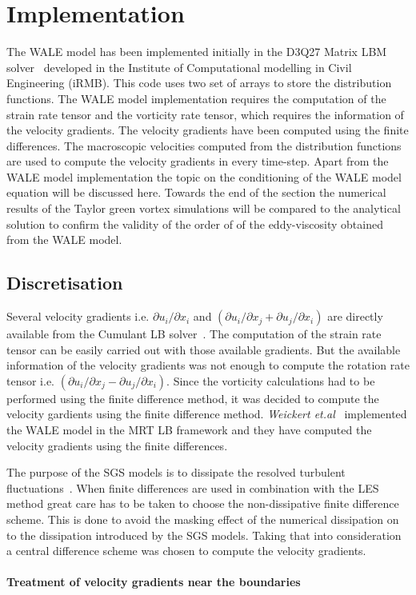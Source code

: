 \newpage

\section{Implementation}
The WALE model has been implemented initially in the D3Q27 Matrix LBM solver~\cite{sonja:12} developed in the Institute of Computational modelling in Civil Engineering (iRMB). This code uses two set of arrays to store the distribution functions. The WALE model implementation requires the computation of the strain rate tensor and the vorticity rate tensor, which requires the information of the velocity gradients. The velocity gradients have been computed using the finite differences. The macroscopic velocities computed from the distribution functions are used to compute the velocity gradients in every time-step. Apart from the WALE model implementation the topic on the conditioning of the WALE model equation will be discussed here. Towards the end of the section the numerical results of the Taylor green vortex simulations will be compared to the analytical solution to confirm the validity of the order of of the eddy-viscosity obtained from the WALE model.

\subsection{Discretisation}
Several velocity gradients i.e. $\partial u_i/\partial x_i$ and $\left(\partial u_i/\partial x_j + \partial u_j/\partial x_i\right)$ are directly available from the Cumulant LB solver~\cite{geier:parameter}. The computation of the strain rate tensor can be easily carried out with those available gradients. But the available information of the velocity gradients was not enough to compute the rotation rate tensor i.e. $\left(\partial u_i/\partial x_j - \partial u_j/\partial x_i\right)$. Since the vorticity calculations had to be  performed using the finite difference method, it was decided to compute the velocity gardients using the finite difference method. \emph{Weickert et.al}~\cite{weickert:LES} implemented the WALE model in the MRT LB framework and they have computed the velocity gradients using the finite differences. 

The purpose of the SGS models is to dissipate the resolved turbulent fluctuations~\cite{davidson}. When finite differences are used in combination with the LES method great care has to be taken to choose the non-dissipative finite difference scheme. This is done to avoid the masking effect of the numerical dissipation on to the dissipation introduced by the SGS models. Taking that into consideration a central difference scheme was chosen to compute the velocity gradients.\\\\
%
\textbf{Treatment of velocity gradients near the boundaries}

